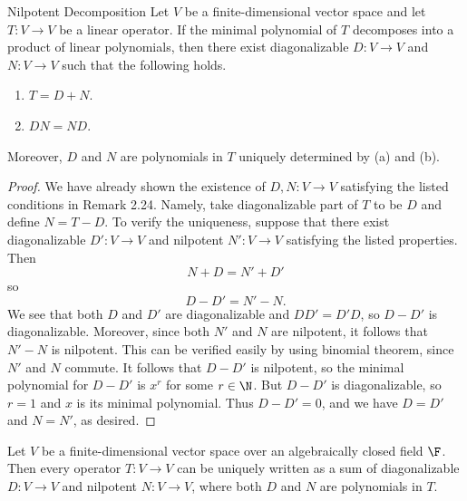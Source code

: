 \documentclass[linearalgebraII]{subfiles}
\begin{document}
    \begin{theorem}{Nilpotent Decomposition}
        Let $V$ be a finite-dimensional vector space and let $T:V\to V$ be a linear operator. If the minimal polynomial of $T$ decomposes into a product of linear polynomials, then there exist diagonalizable $D:V\to V$ and $N:V\to V$ such that the following holds.
        \begin{enumerate}
            \item $T = D+N$.
            \item $DN = ND$.
        \end{enumerate}
        Moreover, $D$ and $N$ are polynomials in $T$ uniquely determined by (a) and (b).
    \end{theorem}

    \begin{proof}
        We have already shown the existence of $D, N:V\to V$ satisfying the listed conditions in Remark 2.24. Namely, take diagonalizable part of $T$ to be $D$ and define $N = T-D$. To verify the uniqueness, suppose that there exist diagonalizable $D':V\to V$ and nilpotent $N':V\to V$ satisfying the listed properties. Then
        \begin{equation*}
            N + D = N' + D'
        \end{equation*}
        so
        \begin{equation*}
            D - D' = N' - N.
        \end{equation*}
        We see that both $D$ and $D'$ are diagonalizable and $DD' = D'D$, so $D-D'$ is diagonalizable. Moreover, since both $N'$ and $N$ are nilpotent, it follows that $N'-N$ is nilpotent. This can be verified easily by using binomial theorem, since $N'$ and $N$ commute. It follows that $D-D'$ is nilpotent, so the minimal polynomial for $D-D'$ is $x^r$ for some $r\in \N$. But $D-D'$ is diagonalizable, so $r=1$ and $x$ is its minimal polynomial. Thus $D-D'=0$, and we have $D=D'$ and
        $N=N'$, as desired. 
    \end{proof}

    \begin{cor}{}
        Let $V$ be a finite-dimensional vector space over an algebraically closed field $\F$. Then every operator $T:V\to V$ can be uniquely written as a sum of diagonalizable $D:V\to V$ and nilpotent $N:V\to V$, where both $D$ and $N$ are polynomials in $T$.
    \end{cor}	
\end{document}
